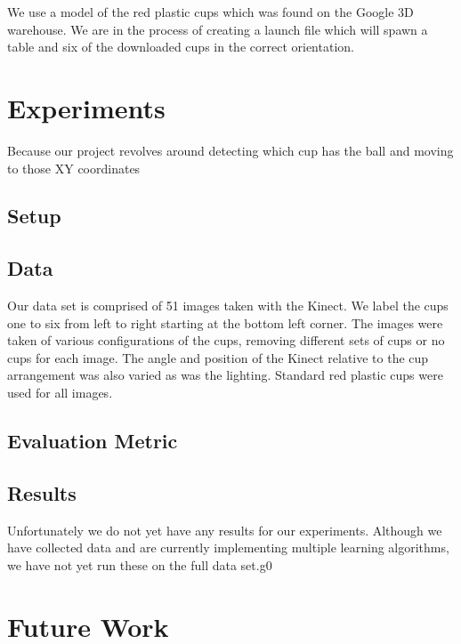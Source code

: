 \documentclass[letterpaper, 10 pt, conference]{ieeeconf}  %
\begin{document}
We use a model of the red plastic cups which was found on the Google 3D warehouse. We are in the process of creating a launch file which will spawn a table and six of the downloaded cups in the correct orientation.


\section{Experiments}

Because our project revolves around detecting which cup has the ball and moving to those XY coordinates

\subsection{Setup}

\subsection{Data}

Our data set is comprised of 51 images taken with the Kinect. We label the cups one to six from left to right starting at the bottom left corner. The images were taken of various configurations of the cups, removing different sets of cups or no cups for each image. The angle and position of the Kinect relative to the cup arrangement was also varied as was the lighting. Standard red plastic cups were used for all images. 

\subsection{Evaluation Metric}

\subsection{Results}

Unfortunately we do not yet have any results for our experiments.  Although we have collected data and are currently implementing multiple learning algorithms, we have not yet run these on the full data set.g0


\section{Future Work}
\end{document}
